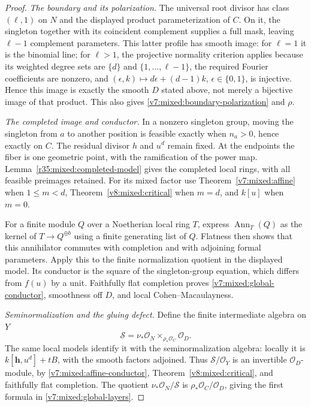 \documentclass[10pt,fleqn]{article}
\numberwithin{equation}{section}
\begin{document}
\begin{proof}
\textit{The boundary and its polarization.}
The universal root divisor has class $(\ell,1)$ on $N$ and the displayed
product parameterization of $C$.  On it, the singleton together with
its coincident complement supplies a full mask, leaving $\ell-1$
complement parameters.  This latter profile has smooth image: for $\ell=1$ it is the binomial line;
for $\ell>1$, the projective normality criterion
\cite[Theorem~6.2]{LiProfileGeometry} applies because its weighted degree
sets are $\{d\}$ and $\{1,\ldots,\ell-1\}$, the required Fourier
coefficients are nonzero, and
$(\epsilon,k)\mapsto d\epsilon+(d-1)k$, $\epsilon\in\{0,1\}$,
is injective.  Hence this image is exactly the smooth $D$ stated above,
not merely a bijective image of that product.  This also gives
\eqref{v7:mixed:boundary-polarization} and $\rho$.

\textit{The completed image and conductor.}
In a nonzero singleton group, moving the singleton from $a$ to another
position is feasible exactly when $n_a>0$, hence exactly on $C$.
The residual divisor $h$ and $u^d$ remain fixed.  At the endpoints the
fiber is one geometric point, with the ramification of the power map.
Lemma~\ref{r35:mixed:completed-model} gives the completed local rings,
with all feasible preimages retained.  For its mixed factor use
Theorem~\ref{v7:mixed:affine} when $1\le m<d$,
Theorem~\ref{v8:mixed:critical} when $m=d$, and $k[u]$ when $m=0$.

For a finite module $Q$ over a Noetherian local ring $T$, express
$\operatorname{Ann}_T(Q)$ as the kernel of
$T\to Q^{\oplus b}$ using a finite generating list of $Q$.
Flatness then shows that this annihilator commutes with completion
and with adjoining formal parameters.  Apply this to the finite
normalization quotient in the displayed model.  Its conductor is the
square of the singleton-group equation, which differs from $f(u)$ by
a unit.  Faithfully flat completion proves
\eqref{v7:mixed:global-conductor}, smoothness off $D$, and local
Cohen--Macaulayness.

\textit{Seminormalization and the gluing defect.}
Define the finite intermediate algebra on $Y$
\[
 \mathcal S=\nu_*\mathcal O_N
       \mathop{\times}_{\rho_*\mathcal O_C}\mathcal O_D.
\]
The same local models identify it with the seminormalization algebra:
locally it is $k[\mathbf h,u^d]+tB$, with the smooth factors adjoined.
Thus $\mathcal S/\mathcal O_Y$ is an invertible $\mathcal O_D$-module,
by \eqref{v7:mixed:affine-conductor}, Theorem~\ref{v8:mixed:critical},
and faithfully flat completion.
The quotient $\nu_*\mathcal O_N/\mathcal S$ is
$\rho_*\mathcal O_C/\mathcal O_D$, giving the first formula in
\eqref{v7:mixed:global-layers}.


\end{proof}
\end{document}
